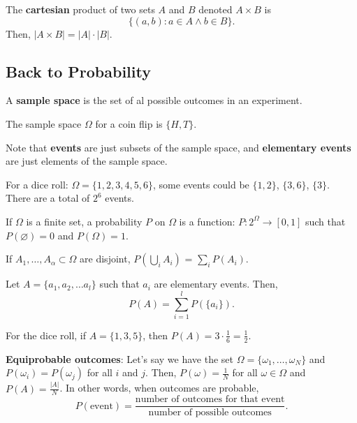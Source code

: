 \begin{definition}
	The \textbf{cartesian} product of two sets \( A \) and \( B \) denoted \( A \times B \) is \[
		\{(a,b) \colon a \in A \land b \in B\}  
	.\] 
	Then, \( |A \times B| = |A| \cdot |B| \).
\end{definition}

\subsection{Back to Probability}

\begin{definition}
	A \textbf{sample space} is the set of al possible outcomes in an experiment.
\end{definition}

\begin{eg}
	The sample space \( \Omega  \) for a coin flip is \( \{H,T\}   \).
\end{eg}

Note that \textbf{events} are just subsets of the sample space, and \textbf{elementary events} are just elements of the sample space.

\begin{eg}
	For a dice roll:	\( \Omega =\{1,2,3,4,5,6\}   \), some events could be \( \{1,2\}   \), \( \{3,6\}   \), \( \{3\}   \). There are a total of \( 2^6 \) events.
\end{eg}
\begin{definition}
	If \( \Omega  \) is a finite set, a probability \( P \) on \( \Omega  \) is a function: \( P \colon 2^{\Omega } \to [0,1]    \) such that \( P(\varnothing) = 0 \) and \( P(\Omega )=1 \).
\end{definition}

\begin{lemma}
	If \( A_{1}, \ldots, A_{\alpha } \subset \Omega  \) are disjoint, \( P(\bigcup_{i}A_i) \) = \( \sum_{i} P(A_i) \).
\end{lemma}

\begin{prop}
	Let \( A = \{a_{1},a_{2},\ldots a_l\}   \) such that \( a_i \) are elementary events. Then, \[
		P(A) = \sum_{i=1}^{l} P(\{a_i\}  )
	.\] 
\end{prop}

\begin{eg}
	For the dice roll, if \( A=\{1,3,5\}   \), then \( P(A) = 3\cdot  \frac{1}{6}= \frac{1}{2} \).
\end{eg}

\begin{definition}
	\textbf{Equiprobable outcomes}: Let's say we have the set \( \Omega =\{\omega_1, \ldots , \omega_N\}   \) and \( P(\omega_i)=P(\omega_j) \) for all \( i \) and \( j \). Then, \( P(\omega) = \frac{1}{N} \) for all \( \omega  \in \Omega  \) and \( P(A) = \frac{|A|}{N} \). In other words, when outcomes are probable, \[ P(\text{event}) = \frac{\text{number of outcomes for that event}}{\text{number of possible outcomes}}.\]
\end{definition}

